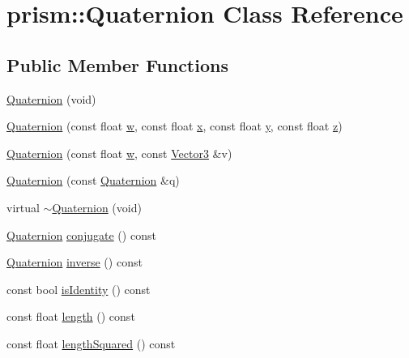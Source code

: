 \hypertarget{classprism_1_1_quaternion}{}\section{prism\+:\+:Quaternion Class Reference}
\label{classprism_1_1_quaternion}
\subsection*{Public Member Functions}
\begin{DoxyCompactItemize}
\item 
\hyperlink{classprism_1_1_quaternion_a0d060b8d3623e2add1d269b4e999663d}{Quaternion} (void)
\item 
\hyperlink{classprism_1_1_quaternion_a331e2d14e97aa22f2cce92088ad5594a}{Quaternion} (const float \hyperlink{classprism_1_1_quaternion_aa930b57c8fbba2855722e82080a23cce}{w}, const float \hyperlink{classprism_1_1_quaternion_ab3f80fc41a933a371b2861363997ce22}{x}, const float \hyperlink{classprism_1_1_quaternion_a37023ce86684cb19287ec52cf27072f7}{y}, const float \hyperlink{classprism_1_1_quaternion_a8af7b070028c48f61d1a76b1b49cbaac}{z})
\item 
\hyperlink{classprism_1_1_quaternion_a04c1b60ecb122ea1eaae090a0e98c083}{Quaternion} (const float \hyperlink{classprism_1_1_quaternion_aa930b57c8fbba2855722e82080a23cce}{w}, const \hyperlink{classprism_1_1_vector3}{Vector3} \&v)
\item 
\hyperlink{classprism_1_1_quaternion_af88cd63d0c271ee5e3f7ba74e3349584}{Quaternion} (const \hyperlink{classprism_1_1_quaternion}{Quaternion} \&q)
\item 
virtual \hyperlink{classprism_1_1_quaternion_a7e456effbcb5d7248a4fb99d756558b9}{$\sim$\+Quaternion} (void)
\item 
\hyperlink{classprism_1_1_quaternion}{Quaternion} \hyperlink{classprism_1_1_quaternion_a62430c8b98581769edbc6d339b4ea17b}{conjugate} () const 
\item 
\hyperlink{classprism_1_1_quaternion}{Quaternion} \hyperlink{classprism_1_1_quaternion_add4c30a874ca1d215c299759e4dd9961}{inverse} () const 
\item 
const bool \hyperlink{classprism_1_1_quaternion_a306069da4c274138899739dc30030ffb}{is\+Identity} () const 
\item 
const float \hyperlink{classprism_1_1_quaternion_a3f40222bff891b3320b7934f4e7e72e6}{length} () const 
\item 
const float \hyperlink{classprism_1_1_quaternion_a9b12ad0b7d021d0116e3a2c29a0ecd88}{length\+Squared} () const 

\end{DoxyCompactItemize}
